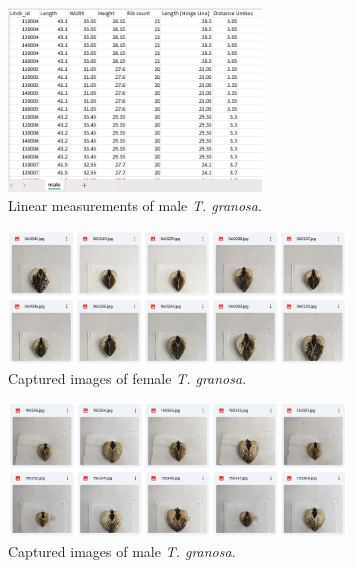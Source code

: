 \begin{figure}[!htbp]
	\centering
	\includegraphics[width=0.6\textwidth]{figures/male_dataset.png}
	\caption{Linear measurements of male \textit{T. granosa}.}
\end{figure}

\newpage
\begin{figure}[!htbp]
	\centering
	\includegraphics[width=0.8\textwidth]{figures/female_dataset(img).png}
	\caption{Captured images of female \textit{T. granosa}.}
\end{figure}
\raggedbottom

\begin{figure}[!htbp]
	\centering
	\includegraphics[width=0.8\textwidth]{figures/male_dataset(img).png}
	\caption{Captured images of male \textit{T. granosa}.}
\end{figure}
\raggedbottom

